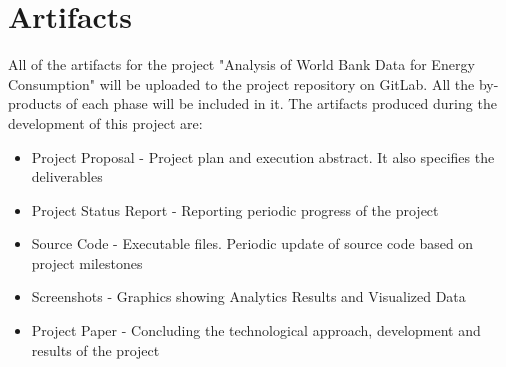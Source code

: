 \documentclass{sig-alternate-05-2015}
\begin{document}
\section{Artifacts}
All of the artifacts for the project "Analysis of World Bank Data for Energy Consumption" will be uploaded to the project repository on GitLab. All the by-products of each phase will be included in it. The artifacts produced during the development of this project are:
\begin{itemize}
\item Project Proposal - Project plan and execution abstract. It also specifies the deliverables
\item Project Status Report - Reporting periodic progress of the project
\item Source Code - Executable files. Periodic update of source code based on project milestones
\item Screenshots - Graphics showing Analytics Results and Visualized Data
\item Project Paper - Concluding the technological approach, development and results of the project
\end{itemize}




 
\end{document}
